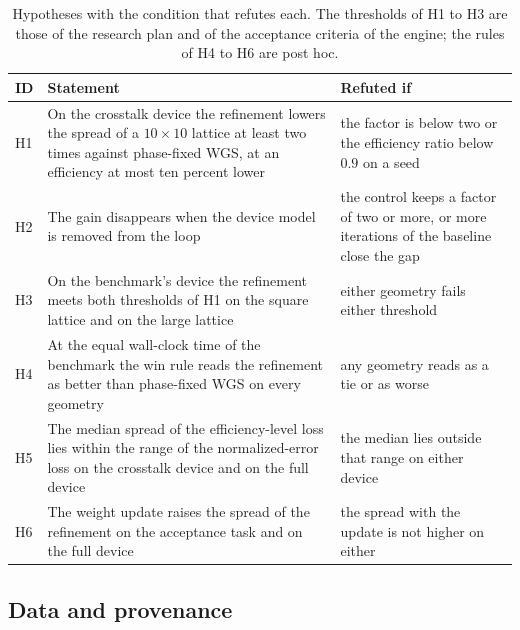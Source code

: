 \begin{table}[t]
\centering\small
\caption{Hypotheses with the condition that refutes each. The thresholds of H1 to H3 are those of the research plan and of the acceptance criteria of the engine; the rules of H4 to H6 are post hoc.}
\label{tab:hyp}
\begin{tabular}{@{}l p{6.4cm} p{6.0cm}@{}}
\toprule
ID & Statement & Refuted if\\
\midrule
H1 & On the crosstalk device the refinement lowers the spread of a $10\times10$ lattice at least two times against phase-fixed WGS, at an efficiency at most ten percent lower & the factor is below two or the efficiency ratio below $0.9$ on a seed\\
H2 & The gain disappears when the device model is removed from the loop & the control keeps a factor of two or more, or more iterations of the baseline close the gap\\
H3 & On the benchmark's device the refinement meets both thresholds of H1 on the square lattice and on the large lattice & either geometry fails either threshold\\
H4 & At the equal wall-clock time of the benchmark the win rule reads the refinement as better than phase-fixed WGS on every geometry & any geometry reads as a tie or as worse\\
H5 & The median spread of the efficiency-level loss lies within the range of the normalized-error loss on the crosstalk device and on the full device & the median lies outside that range on either device\\
H6 & The weight update raises the spread of the refinement on the acceptance task and on the full device & the spread with the update is not higher on either\\
\bottomrule
\end{tabular}
\end{table}

\subsection{Data and provenance}

